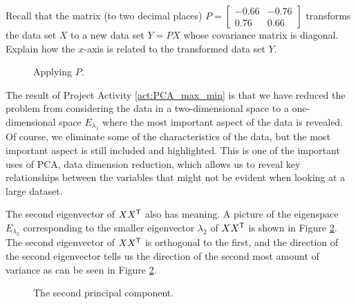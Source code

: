 \begin{pactivity}
\item Recall that the matrix (to two decimal places) $P =  \left[ \begin{array}{rr} - 0.66&-0.76\\ 0.76&0.66\end{array} \right]$ transforms the data set $X$ to a new data set $Y=PX$ whose covariance matrix is diagonal. Explain how the $x$-axis is related to the transformed data set $Y$. 
 
 \begin{figure}[ht]
  \begin{center}
    \caption{Applying $P$.}
    \label{F:PCA_P}
  \end{center}
\end{figure}


\ea

\end{pactivity}

The result of Project Activity \ref{act:PCA_max_min} is that we have reduced the problem from considering the data in a two-dimensional space to a one-dimensional space $E_{\lambda_1}$ where the most important aspect of the data is revealed. Of course, we eliminate some of the characteristics of the data, but the most important aspect is still included and highlighted. This is one of the important uses of PCA, data dimension reduction, which allows us to reveal key relationships between the variables that might not be evident when looking at a large dataset. 

The second eigenvector of $XX^{\mathsf{T}}$ also has meaning. A picture of the eigenspace $E_{\lambda_2}$ corresponding to the smaller eigenvector $\lambda_2$ of $XX^{\mathsf{T}}$ is shown in Figure \ref{F:PCA_second_pc}. The second eigenvector of $XX^{\mathsf{T}}$ is orthogonal to the first, and the direction of the second eigenvector tells us the direction of the second most amount of  variance as can be seen in Figure \ref{F:PCA_second_pc}.
\begin{figure}[ht]
  \begin{center}
    \caption{The second principal component.}
    \label{F:PCA_second_pc}
  \end{center}
\end{figure}


